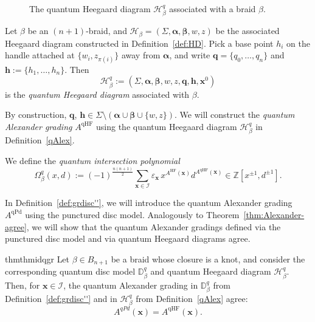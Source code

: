 \documentclass[11pt]{amsart}
\numberwithin{equation}{section}
\numberwithin{figure}{section}
\theoremstyle{definition}
\newcommand{\cH}{\mathcal{H}}
\newcommand{\cI}{\mathcal{I}}
\newcommand{\bD}{\mathbb{D}}
\newcommand{\bZ}{\mathbb{Z}}
\DeclareMathOperator{\qHF}{qHF}
\DeclareMathOperator{\HF}{HF}
\DeclareMathOperator{\qPd}{qPd}
\newcommand{\as}{\boldsymbol{\alpha}}
\newcommand{\bs}{\boldsymbol{\beta}}
\newcommand{\hs}{\boldsymbol{h}}
\newcommand{\qs}{\boldsymbol{q}}
\newcommand{\xs}{\boldsymbol{x}}
\begin{document}
\begin{figure}
\centering
\def\svgwidth{1.5\textwidth}

\caption{The quantum Heegaard diagram $\cH^q_\beta$ associated with a braid $\beta$.}\label{SurfJ}
\end{figure}

\begin{defn}\label{def:quantum-Heegaard-diagram}
    Let $\beta$ be an $(n+1)$-braid, and $\mathscr H_{\beta} = (\Sigma, \as, \bs, w, z)$ be the associated Heegaard diagram constructed in Definition~\ref{def:HD}. Pick a base point $h_i$ on the handle attached at $\{w_i,z_{\pi(i)}\}$ away from $\as$, and write $\qs = \{q_0,\dots,q_n\}$ and $\hs := \{h_1,\dots,h_n\}$. Then 
    \[
    \mathscr H^q_{\beta}:=(\Sigma,\as,\bs, w, z, \qs, \hs, \xs^0)
    \]
    is the \emph{quantum Heegaard diagram} associated with $\beta$.
\end{defn}

By construction, $\qs$, $\hs \in \Sigma \setminus (\as \cup \bs \cup \{w,z\})$. We will construct the \emph{quantum Alexander grading} $A^{\qHF}$ using the quantum Heegaard diagram $\cH^q_{\beta}$ in Definition~\ref{qAlex}.

\begin{defn}\label{def:quantum-intersection}
We define the \emph{quantum intersection polynomial}
\begin{equation}
\Omega^q_\beta(x,d):= (-1)^{\frac{n(n+1)}{2}}\sum_{\xs\in \cI} \varepsilon_{\xs} \, x^{A^{\HF}(\xs)} d^{A^{\qHF}(\xs)} \in \bZ[x^{\pm 1}, d^{\pm 1}].
\end{equation}
\end{defn}

In Definition~\ref{def:grdisc''}, we will introduce the quantum Alexander grading $A^{\qPd}$ using the punctured disc model. Analogously to Theorem~\ref{thm:Alexander-agree}, we will show that the quantum Alexander gradings defined via the punctured disc model and via quantum Heegaard diagrams agree.

\begin{restatable}{thm}{thmidqgr}
\label{thm:Jones-agree} 
Let $\beta \in B_{n+1}$ be a braid whose closure is a knot, and consider the corresponding quantum disc model $\bD_\beta^q$ and quantum Heegaard diagram $\mathscr H^q_{\beta}$. Then, for $\xs \in \cI$, the quantum Alexander grading in $\bD_\beta^q$ from Definition~\ref{def:grdisc''} and in $\cH^q_\beta$ from Definition~\ref{qAlex} agree:
\begin{equation}
A^{qPd}(\xs) = A^{\qHF}(\xs).
\end{equation}
\end{restatable}
\end{document}
